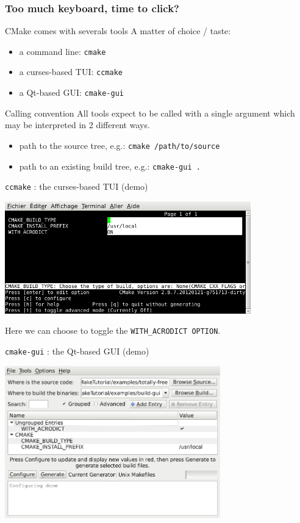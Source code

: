 \documentclass[compress,slidestop,table
              ]
               {beamer}
\newcommand{\fname}[1]{\texttt{#1}}
\begin{document}
\begin{frame}
  \frametitle{Too much keyboard, time to click?}

\begin{block}{CMake comes with severals tools}
  A matter of choice / taste:
  \vspace*{0.4cm}
\begin{itemize}
\item a command line: \fname{cmake}
\item a curses-based TUI: \fname{ccmake}
\item a Qt-based GUI: \fname{cmake-gui}
\end{itemize}
\end{block}

\begin{alertblock}{Calling convention}
All tools expect to be called with a single argument
which may be interpreted in 2 different ways.
\vspace*{0.4cm}
\begin{itemize}
\item path to the source tree, e.g.: \fname{cmake /path/to/source}
\item path to an \alert{existing} build tree, e.g.: \fname{cmake-gui .}
\end{itemize}
\end{alertblock}

\begin{center}
\fname{ccmake} : the curses-based TUI (demo)

\includegraphics[width=0.8\textwidth]{ccmake-1}

Here we can choose to toggle the \lstinline!WITH_ACRODICT OPTION!.
\end{center}

\begin{center}
\fname{cmake-gui} : the Qt-based GUI (demo)

\includegraphics[width=0.7\textwidth]{cmake-gui-1}


\end{center}
\end{frame}
\end{document}
